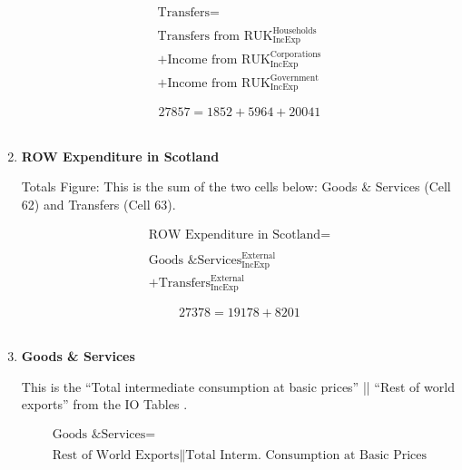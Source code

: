 \begin{enumerate}
\begin{equation}
\begin{split}
\text{Transfers} =  \\ \\
\text{Transfers from RUK}^\text{Households}_\text{IncExp}\\
+\text{Income from RUK}^\text{Corporations}_\text{IncExp}\\
+\text{Income from RUK}^\text{Government}_\text{IncExp}
\end{split} \label{eq:2.5.64}
\end{equation}

\begin{equation} \nonumber
27857 = 1852+5964+20041
\end{equation}\\


\item \textbf {ROW Expenditure in Scotland}

Totals Figure: This is the sum of the two cells below: Goods \& Services (Cell 62) and Transfers (Cell 63).

\begin{equation}
\begin{split}
\text{ROW Expenditure in Scotland} =  \\ \\
\text{Goods \& Services}^\text{External}_\text{IncExp}\\
+\text{Transfers}^\text{External}_\text{IncExp}
\end{split} \label{eq:2.5.65}
\end{equation}

\begin{equation} \nonumber
27378 = 19178+8201
\end{equation}\\


\item \textbf {Goods \& Services}

This is the ``Total intermediate consumption at basic prices'' || ``Rest of world exports'' from the IO Tables \cite{ScotGov2013a}.

\begin{equation}
\begin{split}
\text{Goods \& Services} =  \\ \\
\text{Rest of World Exports}\|\text{Total Interm. Consumption at Basic Prices}
\end{split} \label{eq:2.5.66}
\end{equation}


\end{enumerate}
